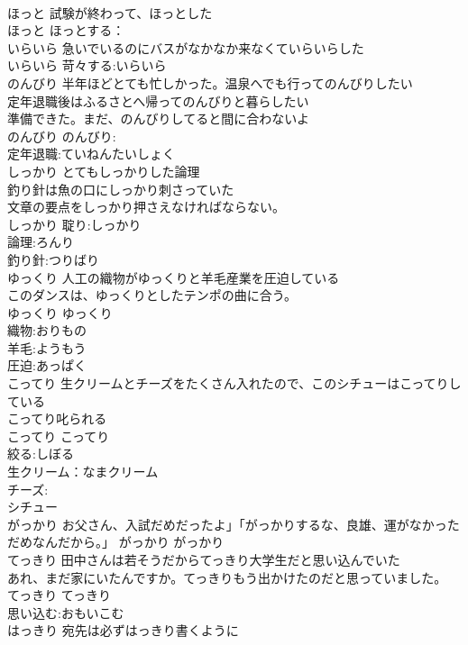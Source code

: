 \documentclass[8pt]{extreport}
\begin{document}
\begin{CJK}{UTF8}{min}
\\	ほっと	試験が終わって、ほっとした 
\\	ほっと			ほっとする：
\\	いらいら	急いでいるのにバスがなかなか来なくていらいらした 
\\	いらいら			苛々する:いらいら
\\	のんびり	半年ほどとても忙しかった。温泉へでも行ってのんびりしたい 
\\	定年退職後はふるさとへ帰ってのんびりと暮らしたい 
\\	準備できた。まだ、のんびりしてると間に合わないよ 
\\	のんびり			のんびり:
\\	定年退職:ていねんたいしょく
\\	しっかり	とてもしっかりした論理 
\\	釣り針は魚の口にしっかり刺さっていた 
\\	文章の要点をしっかり押さえなければならない。 
\\	しっかり			聢り:しっかり 
\\	論理:ろんり
\\	釣り針:つりばり
\\	ゆっくり	人工の織物がゆっくりと羊毛産業を圧迫している 
\\	このダンスは、ゆっくりとしたテンポの曲に合う。 
\\	ゆっくり			ゆっくり
\\	織物:おりもの
\\	羊毛:ようもう
\\	圧迫:あっぱく
\\	こってり	生クリームとチーズをたくさん入れたので、このシチューはこってりしている 
\\	こってり叱られる 
\\	こってり			こってり
\\	絞る:しぼる
\\	生クリーム：なまクリーム
\\	チーズ:
\\	シチュー
\\	がっかり	お父さん、入試だめだったよ」「がっかりするな、良雄、運がなかっただめなんだから。」	がっかり			がっかり 
\\	てっきり	田中さんは若そうだからてっきり大学生だと思い込んでいた 
\\	あれ、まだ家にいたんですか。てっきりもう出かけたのだと思っていました。 
\\	てっきり			てっきり 
\\	思い込む:おもいこむ
\\	はっきり	宛先は必ずはっきり書くように 

\end{CJK}
\end{document}

